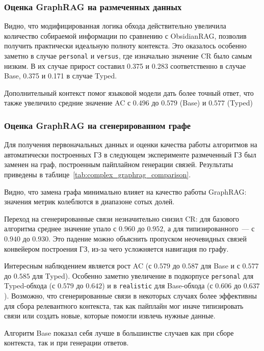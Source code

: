 \subsubsection*{Оценка GraphRAG на размеченных данных}

Видно, что модифицированная логика обхода действительно
увеличила количество собираемой информации по сравнению с ObsidianRAG,
позволив получить практически идеальную полноту контекста.
Это оказалось особенно заметно в случае \texttt{personal} и \texttt{versus},
где изначально значение CR было самым низким.
В их случае прирост составил 0.375 и 0.283 соответственно в случае Base,
0.375 и 0.171 в случае Typed.

Дополнительный контекст помог языковой модели дать более точный ответ,
что также увеличило средние значение AC с
$0.496$ до $0.579$ (Base) и $0.577$ (Typed)

\subsubsection*{Оценка GraphRAG на сгенерированном графе}

Для получения первоначальных данных и оценки качества
работы алгоритмов на автоматически построенных ГЗ
в следующем эксперименте размеченный ГЗ был заменен
на граф, построенным пайплайном генерации связей.
Результаты приведены в таблице~\ref{tab:complex_graphrag_comparison}.

Видно, что замена графа минимально влияет на качество работы GraphRAG:
значения метрик колеблются в диапазоне сотых долей.

Переход на сгенерированные связи незначительно снизил CR:
для базового алгоритма среднее значение упало
с $0.960$ до $0.952$, а для типизированного~— с $0.940$ до $0.930$.
Это падение можно
объяснить пропуском неочевидных связей конвейером построения ГЗ,
из-за чего усложняется навигация по графу.

Интересным наблюдением является рост AC
(с $0.579$ до $0.587$ для Base и с $0.577$ до $0.585$ для Typed).
Особенно заметно увеличение в
подкорпусе \texttt{personal} для Typed-обхода (с $0.579$ до $0.642$)
и в \texttt{realistic} для Base-обхода (с $0.606$ до $0.637$).
Возможно, что сгенерированные связи в некоторых случаях
более эффективны для сбора релевантного контекста,
так как пайплайн мог иначе типизировать связи или создать новые,
которые помогли извлечь нужные данные.

Алгоритм Base показал себя лучше в большинстве случаев
как при сборе контекста, так и при генерации ответов.

